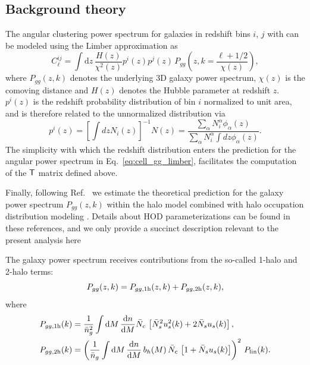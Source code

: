 \documentclass[a4paper,11pt]{article}
\begin{document}
    \subsection{Background theory}\label{ssec:hsc.theory}
      The angular clustering power spectrum for galaxies in redshift bins $i$, $j$ with can be modeled using the Limber approximation as \cite{1953ApJ...117..134L, 1992ApJ...388..272K, Kaiser:1998}
      \begin{equation}\label{eq:cell_gg_limber}
        C^{ij}_\ell = \int \mathrm{d}z\,\frac{H(z)}{\chi^2(z)} p^i(z)p^j(z)\,P_{gg}\left(z,k=\frac{\ell+1/2}{\chi(z)}\right),
    \end{equation}
    where $P_{gg}(z,k)$ denotes the underlying 3D galaxy power spectrum, $\chi(z)$ is the comoving distance and $H(z)$ denotes the Hubble parameter at redshift $z$. $p^i(z)$ is the redshift probability distribution of bin $i$ normalized to unit area, and is therefore related to the unnormalized distribution via
    \begin{equation}
      p^i(z)=\left[\int dz N_i(z)\right]^{-1}N(z)=\frac{\sum_\alpha N^\alpha_i\phi_\alpha(z)}{\sum_\alpha N^\alpha_i\int dz\phi_\alpha(z)}.
    \end{equation}
    The simplicity with which the redshift distribution enters the prediction for the angular power spectrum in Eq.~\ref{eq:cell_gg_limber}, facilitates the computation of the ${\sf T}$ matrix defined above. 

    Finally, following Ref.~\cite{1912.08209} we estimate the theoretical prediction for the galaxy power spectrum $P_{gg}(z,k)$ within the halo model combined with halo occupation distribution modeling \cite{2000MNRAS.318.1144P,2002PhR...372....1C,2002ApJ...575..587B,2005ApJ...633..791Z,2013MNRAS.430..725V}. Details about HOD parameterizations can be found in these references, and we only provide a succinct description relevant to the present analysis here
    
    The galaxy power spectrum receives contributions from the so-called 1-halo and 2-halo terms:
    \begin{equation}
      P_{gg}(z,k) = P_{gg,{\rm 1h}}(z,k) + P_{gg,{\rm 2h}}(z,k),
    \end{equation}
    where
    \begin{align}
      & P_{gg,{\rm 1h}}(k)=\frac{1}{\bar{n}_g^2} \int \mathrm{d}M\,\frac{\mathrm{d}n}{\mathrm{d}M} \bar{N}_c\,\left[\bar{N}_s^2u_s^2(k)+2\bar{N}_su_s(k)\right],\\
      & P_{gg,{\rm 2h}}(k)=\left(\frac{1}{\bar{n}_g} \int \mathrm{d}M\,\frac{\mathrm{d}n}{\mathrm{d}M}\,b_h(M)\,\bar{N}_c\,\left[1+\bar{N}_su_s(k)\right]\right)^2\,P_{\rm lin}(k).
    \end{align}
    
\end{document}
